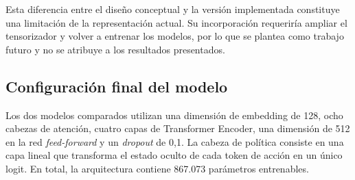 Esta diferencia entre el diseño conceptual y la versión implementada constituye una limitación de la representación actual. Su incorporación requeriría ampliar el tensorizador y volver a entrenar los modelos, por lo que se plantea como trabajo futuro y no se atribuye a los resultados presentados.

\subsection{Configuración final del modelo}

Los dos modelos comparados utilizan una dimensión de embedding de 128, ocho cabezas de atención, cuatro capas de Transformer Encoder, una dimensión de 512 en la red \textit{feed-forward} y un \textit{dropout} de 0,1. La cabeza de política consiste en una capa lineal que transforma el estado oculto de cada token de acción en un único logit. En total, la arquitectura contiene 867.073 parámetros entrenables.
